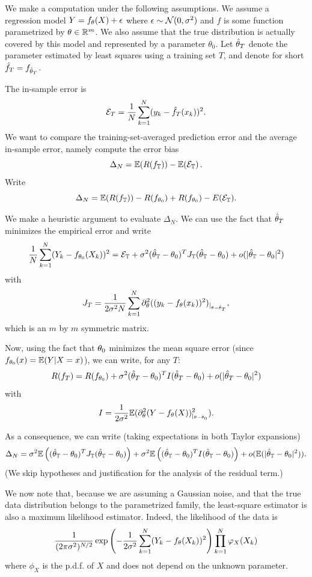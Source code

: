


We make a computation under the following assumptions. We assume a regression model $Y = f_\theta(X) + \epsilon$ where $\epsilon \sim {\mathcal N}(0, \sigma^2)$ and $f$ is some function parametrized by $\theta \in {\mathbb{R}}^m$. We also assume that the true distribution is actually covered by this model and represented by a parameter $\theta_0$. Let ${\hat{\theta}}_T$ denote the parameter estimated by least squares using a training set $T$, and denote for short ${\hat{f}}_T = f_{{\hat{\theta}}_T}$. 

The in-sample error is
\[
{\mathcal E}_T = \frac1N \sum_{k=1}^N (y_k - {\hat{f}}_T(x_k))^2.
\]
We  want to compare the training-set-averaged prediction error and the average in-sample error, namely compute the error bias
\[
\Delta_N = \bm{\mathbb E}(R(f_{\mathbb T})) - \bm{\mathbb E}({\mathcal E}_{\mathbb T})\,.
\]
Write 
\[
\Delta_N = \bm{\mathbb E}(R(f_{\mathbb T})) - R(f_{\theta_0}) + R(f_{\theta_0}) - E({\mathcal E}_{\mathbb T}).
\]

We  make a heuristic argument to evaluate $\Delta_N$.
We can use the fact that ${\hat{\theta}}_T$ minimizes the empirical error and write
\[
\frac1N \sum_{k=1}^N (Y_k-f_{\theta_0}(X_k))^2 = {\mathcal E}_{\mathbb T} +  \sigma^2 ({\hat{\theta}}_{\mathbb T} - \theta_0)^T J_{{\mathbb T}} ({\hat{\theta}}_{\mathbb T} - \theta_0) + o(|{\hat{\theta}}_{\mathbb T} - \theta_0|^2)
\]
with 
\[
J_T = \frac1{2\sigma^2 N} \sum_{k=1}^N \partial_\theta^2 ((y_k - f_\theta(x_k))^2)_{|_{\theta-{\hat{\theta}}_T}},
\]
which is an $m$ by $m$ symmetric matrix.

Now, using the fact that $\theta_0$ minimizes the mean square error (since $f_{\theta_0}(x) = \bm{\mathbb E}(Y|X=x)$), we can write, for any $T$:
\[
R(f_T) = R(f_{\theta_0}) +  \sigma^2 ({\hat{\theta}}_T - \theta_0)^T I  ({\hat{\theta}}_T - \theta_0) + o(|{\hat{\theta}}_T - \theta_0|^2)
\]
with 
\[
I = \frac1{2\sigma^2}  \bm{\mathbb E}(\partial_\theta^2 (Y-f_{\theta}(X))^2_{|_{\theta-\theta_0}}).
\]

As a consequence, we can write (taking expectations in both Taylor expansions)
\[
\Delta_N = \sigma^2 \bm{\mathbb E} \left(({\hat{\theta}}_{\mathbb T} - \theta_0)^T J_{{\mathbb T}} ({\hat{\theta}}_{\mathbb T} - \theta_0) \right)+ \sigma^2 \bm{\mathbb E}\left(({\hat{\theta}}_{\mathbb T} - \theta_0)^T I  ({\hat{\theta}}_{\mathbb T} - \theta_0)\right) + o(\bm{\mathbb E}(|{\hat{\theta}}_{\mathbb T} - \theta_0|^2)).
\]
(We skip hypotheses and justification for the analysis of the residual term.)

We now note that, because we are assuming a Gaussian noise, and that the true data distribution belongs to the parametrized family, the least-square estimator is also a maximum likelihood estimator. Indeed, the likelihood of the data is
\[
\frac{1}{(2\pi\sigma^2)^{N/2}} \exp\left(- \frac1{2\sigma^2}\sum_{k=1}^N (Y_k - f_{\theta}(X_k))^2\right) \prod_{k=1}^N \varphi_X(X_k)
\]
where $\phi_X$ is the p.d.f.  of $X$ and does not depend on the unknown parameter. 

